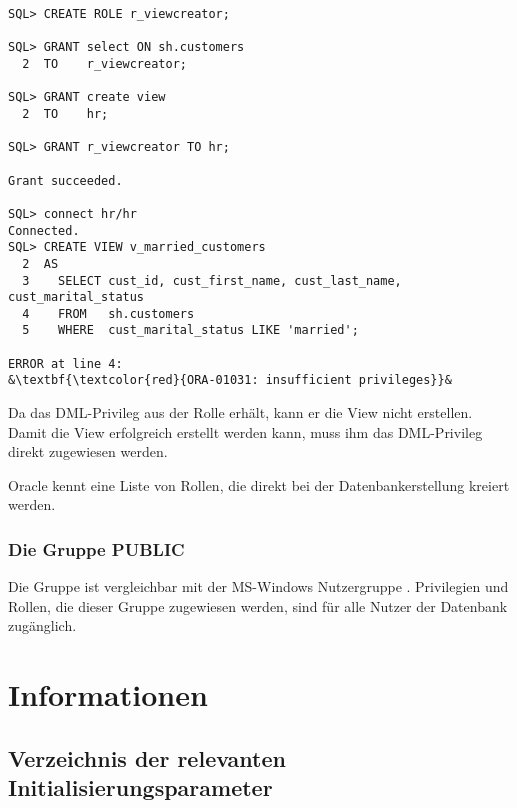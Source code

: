           \begin{lstlisting}[caption={Erstellen der View \identifier{v\_married\_customers}},label=admin251,language=oracle_sql,alsolanguage=sqlplus]
SQL> CREATE ROLE r_viewcreator;

SQL> GRANT select ON sh.customers
  2  TO    r_viewcreator;

SQL> GRANT create view
  2  TO    hr;

SQL> GRANT r_viewcreator TO hr;

Grant succeeded.

SQL> connect hr/hr
Connected.
SQL> CREATE VIEW v_married_customers
  2  AS
  3    SELECT cust_id, cust_first_name, cust_last_name, cust_marital_status
  4    FROM   sh.customers
  5    WHERE  cust_marital_status LIKE 'married';

ERROR at line 4:
&\textbf{\textcolor{red}{ORA-01031: insufficient privileges}}&

          \end{lstlisting}
          Da  das DML-Privileg aus der Rolle  erhält, kann er die View nicht erstellen. Damit die View erfolgreich erstellt werden kann, muss ihm das DML-Privileg direkt zugewiesen werden.
          \begin{merke}
            Oracle kennt eine Liste von Rollen, die direkt bei der Datenbankerstellung kreiert werden.
          \end{merke}
        \subsubsection{Die Gruppe PUBLIC}
          Die Gruppe  ist vergleichbar mit der MS-Windows Nutzergruppe . Privilegien und Rollen, die dieser Gruppe zugewiesen werden, sind für alle Nutzer der Datenbank zugänglich.
\clearpage
    \section{Informationen}
      \subsection{Verzeichnis der relevanten Initialisierungsparameter}
        \begin{literaturinternet}
          \item \cite{REFRN10133}
          \item \cite{REFRN10184}
        \end{literaturinternet}

